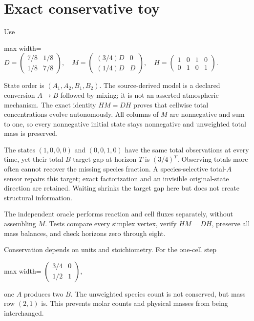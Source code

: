 \documentclass[
  11pt,
  a4paper,
]{report}
\begin{document}
\hypertarget{exact-conservative-toy}{%
\section{Exact conservative toy}\label{exact-conservative-toy}}

Use \begin{center}
\begin{adjustbox}{max width=\linewidth}
$\displaystyle
D=\begin{pmatrix}7/8&1/8\\1/8&7/8\end{pmatrix},\quad
M=\begin{pmatrix}(3/4)D&0\\(1/4)D&D\end{pmatrix},\quad
H=\begin{pmatrix}1&0&1&0\\0&1&0&1\end{pmatrix}.
$
\end{adjustbox}
\end{center} State order is \((A_1,A_2,B_1,B_2)\). The source-derived model is a
declared conversion \(A\to B\) followed by mixing; it is not an asserted
atmospheric mechanism. The exact identity \(HM=DH\) proves that cellwise
total concentrations evolve autonomously. All columns of \(M\) are
nonnegative and sum to one, so every nonnegative initial state stays
nonnegative and unweighted total mass is preserved.

The states \((1,0,0,0)\) and \((0,0,1,0)\) have the same total
observations at every time, yet their total-\(B\) target gap at horizon
\(T\) is \((3/4)^T\). Observing totals more often cannot recover the
missing species fraction. A species-selective total-\(A\) sensor repairs
this target; exact factorization and an invisible original-state
direction are retained. Waiting shrinks the target gap here but does not
create structural information.

The independent oracle performs reaction and cell fluxes separately,
without assembling \(M\). Tests compare every simplex vertex, verify
\(HM=DH\), preserve all mass balances, and check horizons zero through
eight.

Conservation depends on units and stoichiometry. For the one-cell step
\begin{center}
\begin{adjustbox}{max width=\linewidth}
$\displaystyle
\begin{pmatrix}3/4&0\\1/2&1\end{pmatrix},
$
\end{adjustbox}
\end{center} one \(A\) produces two \(B\). The unweighted species count is not
conserved, but mass row \((2,1)\) is. This prevents molar counts and
physical masses from being interchanged.
\end{document}
